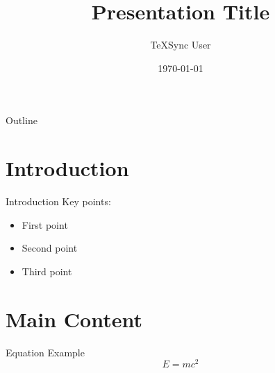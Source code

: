 \documentclass{beamer}
\title{Presentation Title}
\author{TeXSync User}
\date{\today}
\begin{document}
\begin{frame}
\titlepage
\end{frame}

\begin{frame}{Outline}
\tableofcontents
\end{frame}

\section{Introduction}
\begin{frame}{Introduction}
Key points:
\begin{itemize}
\item First point
\item Second point
\item Third point
\end{itemize}
\end{frame}

\section{Main Content}
\begin{frame}{Equation Example}
$$E = mc^2$$
\end{frame}
\end{document}
